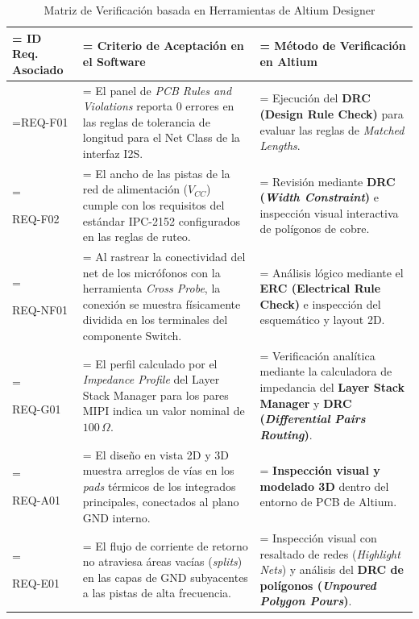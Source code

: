 \documentclass[%
	paper=a4,				%
	twoside=false,				%
	parskip=half,				%
	chapterprefix=false, 		%
	10pt,						%
	headings=normal,			%
	bibliography=totoc,			%
	listof=totoc,				%
	titlepage=on,				%
	captions=tableabove,		%
	draft=false,				%
]{scrbook}%
\begin{document}
\begin{table}[H]
    \caption{Matriz de Verificación basada en Herramientas de Altium Designer}
    \centering
    \renewcommand{\arraystretch}{1.5}
    \begin{tabularx}{\textwidth}{|>{\hsize=0.15\hsize\linewidth=\hsize}X|
                                   >{\hsize=0.45\hsize\linewidth=\hsize}X|
                                   >{\hsize=0.4\hsize\linewidth=\hsize}X|}
        \hline
        \rowcolor[HTML]{EFEFEF} 
        \textbf{ID Req. Asociado} & \textbf{Criterio de Aceptación en el Software} & \textbf{Método de Verificación en Altium} \\ \hline
        
        REQ-F01 & El panel de \textit{PCB Rules and Violations} reporta 0 errores en las reglas de tolerancia de longitud para el Net Class de la interfaz I2S. & Ejecución del \textbf{DRC (Design Rule Check)} para evaluar las reglas de \textit{Matched Lengths}. \\ \hline
        
        REQ-F02 & El ancho de las pistas de la red de alimentación ($V_{CC}$) cumple con los requisitos del estándar IPC-2152 configurados en las reglas de ruteo. & Revisión mediante \textbf{DRC (\textit{Width Constraint})} e inspección visual interactiva de polígonos de cobre. \\ \hline

        REQ-NF01 & Al rastrear la conectividad del net de los micrófonos con la herramienta \textit{Cross Probe}, la conexión se muestra físicamente dividida en los terminales del componente Switch. & Análisis lógico mediante el \textbf{ERC (Electrical Rule Check)} e inspección del esquemático y layout 2D. \\ \hline
        
        REQ-G01 & El perfil calculado por el \textit{Impedance Profile} del Layer Stack Manager para los pares MIPI indica un valor nominal de $100\,\Omega$. & Verificación analítica mediante la calculadora de impedancia del \textbf{Layer Stack Manager} y \textbf{DRC (\textit{Differential Pairs Routing})}. \\ \hline
        
        REQ-A01 & El diseño en vista 2D y 3D muestra arreglos de vías en los \textit{pads} térmicos de los integrados principales, conectados al plano GND interno. & \textbf{Inspección visual y modelado 3D} dentro del entorno de PCB de Altium. \\ \hline
        
        REQ-E01 & El flujo de corriente de retorno no atraviesa áreas vacías (\textit{splits}) en las capas de GND subyacentes a las pistas de alta frecuencia. & Inspección visual con resaltado de redes (\textit{Highlight Nets}) y análisis del \textbf{DRC de polígonos (\textit{Unpoured Polygon Pours})}. \\ \hline

    \end{tabularx}
\end{table}
\end{document}
